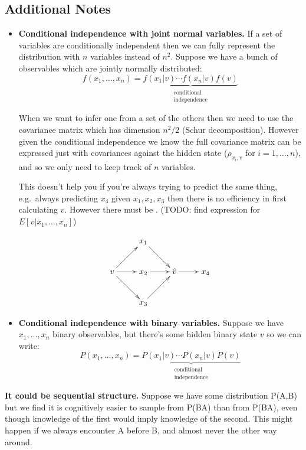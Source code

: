 \documentclass[
  11pt,
  letterpaper,
  DIV=11,
  numbers=noendperiod,
  oneside]{scrartcl}
\newcommand{\utt}[3]{\underbrace{#1}_{\substack{\text{#2}\\\text{#3}}}}
\begin{document}
\hypertarget{additional-notes}{%
\subsection{Additional Notes}\label{additional-notes}}

\begin{itemize}
\item
  \textbf{Conditional independence with joint normal variables.} If a
  set of variables are conditionally independent then we can fully
  represent the distribution with \(n\) variables instead of \(n^2\).
  Suppose we have a bunch of observables which are jointly normally
  distributed:
  \[f(x_1,\ldots,x_n)=\utt{f(x_1|v)\cdots f(x_n|v)f(v)}{conditional}{independence}\]

  When we want to infer one from a set of the others then we need to use
  the covariance matrix which has dimension \(n^2/2\) (Schur
  decomposition). However given the conditional independence we know the
  full covariance matrix can be expressed just with covariances against
  the hidden state (\(\rho_{x_i,v}\) for \(i=1,\ldots,n\)), and so we
  only need to keep track of \(n\) variables.

  This doesn't help you if you're always trying to predict the same
  thing, e.g.~always predicting \(x_4\) given \(x_1,x_2,x_3\) then there
  is no efficiency in first calculating \(v\). However there must be .
  (TODO: find expression for \(E[v|x_1,\ldots,x_n]\))

  \[\xymatrix{
                                 & x_1\ar[dr]    & \\
         v \ar[ur]\ar[r]\ar[dr]  & x_2\ar[r]    & \hat{v}\ar[r] & x_4\\
                                 & x_3\ar[ur]}
   \]
\item
  \textbf{Conditional independence with binary variables.} Suppose we
  have \(x_1,\ldots,x_n\) binary observables, but there's some hidden
  binary state \(v\) so we can write:
  \[P(x_1,\ldots,x_n)=\utt{P(x_1|v)\cdots P(x_n|v)P(v)}{conditional}{independence}\]
\end{itemize}

\textbf{It could be sequential structure.} Suppose we have some
distribution P(A,B) but we find it is cognitively easier to sample from
P(B\textbar A) than from P(B\textbar A), even though knowledge of the
first would imply knowledge of the second. This might happen if we
always encounter A before B, and almost never the other way around.
\end{document}
